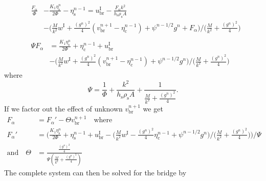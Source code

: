 \documentclass{article}
\begin{document}
\begin{align}
    &\begin{aligned}
        \frac{F_\alpha}{\Phi}&-\frac{K_1\eta_\text{s}^n}{2\Phi}-\eta_\text{s}^{n-1}= u^\text{I}_\text{br}-\frac{F_\alpha k^2}{h_\text{s}\rho_\text{s}A}\\
    &-\bigg(\frac{M}{k^2}w^\text{I}+\frac{(g^n)^2}{4}(v_{\text{br}}^{n+1}-\eta_\text{c}^{n-1}) + \psi^{n-1/2}g^n + F_\alpha\bigg)/\bigg(\frac{M}{k^2}+\frac{(g^n)^2}{4}\bigg)
    \end{aligned}\\
    &\begin{aligned}
    \Psi F_\alpha &= \frac{K_1\eta_\text{s}^n}{2\Phi}+\eta_\text{c}^{n-1}+ u^\text{I}_\text{br}\\
    &-\bigg(\frac{M}{k^2}w^\text{I}+\frac{(g^n)^2}{4}(v_{\text{br}}^{n+1}-\eta_\text{c}^{n-1}) + \psi^{n-1/2}g^n\bigg)/ \bigg(\frac{M}{k^2}+\frac{(g^n)^2}{4}\bigg)
    \end{aligned}
\end{align}
where 
\begin{equation}
    \Psi = \frac{1}{\Phi} + \frac{k^2}{h_\text{s}\rho_\text{s}A}+\frac{1}{\frac{M}{k^2}+\frac{(g^n)^2}{4}}.
\end{equation}
If we factor out the effect of unknown $v_\text{br}^{n+1}$ we get
\begin{equation}
\begin{aligned}
    F_\alpha &= F_\alpha'- \Theta v_{\text{br}}^{n+1} \quad \text{where}\\
    F_\alpha' &= \Bigg(\frac{K_1\eta_\text{s}^n}{2\Phi}+\eta_\text{s}^{n-1}+ u^\text{I}_\text{br}
    -\bigg(\frac{M}{k^2}w^\text{I}-\frac{(g^n)^2}{4}\eta_\text{c}^{n-1} + \psi^{n-1/2}g^n\bigg)/ \bigg(\frac{M}{k^2}+\frac{(g^n)^2}{4}\bigg)\Bigg) / \Psi \nonumber \\
    \text{and} \quad \Theta &= \frac{\frac{(g^n)^2}{4}}{\Psi(\frac{M}{k^2}+\frac{(g^n)^2}{4})}
    \end{aligned}
\end{equation}
The complete system can then be solved for the bridge by
\end{document}
